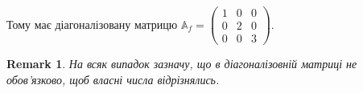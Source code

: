 \documentclass[a4paper, 10pt]{article}
\theoremstyle{theoremdd}
\newtheorem{remark}[theorem]{Remark}
\begin{document}
Тому має діагоналізовану матрицю $\mathbb{A}_f = \begin{pmatrix}
1 & 0 & 0 \\
0 & 2 & 0 \\
0 & 0 & 3
\end{pmatrix}$.
\iffalse
Ба більше, ми можемо розкрити деякі цікаві факти\\
\begin{tikzcd}
\mathbb{R}^3_f \arrow{r}{\mathbb{A}_f} \arrow{d}[swap]{U} & \mathbb{R}^3_f \arrow{d}{U} \\
\mathbb{R}^3_e \arrow{r}{A} & \mathbb{R}^3_e
\end{tikzcd}\\
Тут $U = \begin{pmatrix}
1 & 1 & 1 \\
1 & 0 & 1 \\
1 & 1 & 0 \\
\end{pmatrix}$\\
З картинки можна знайти:\\
$A = U \mathbb{A}_f U^{-1}$\\
$A^2 = A\cdot A = U \mathbb{A}_f U^{-1} U \mathbb{A}_f U^{-1} = U \mathbb{A}_f^2 U^{-1}$\\
$A^3 = A^2 \cdot A = U \mathbb{A}^2_f U^{-1} U \mathbb{A}_f U^{-1} = U \mathbb{A}_f^3 U^{-1}$\\
Ну і т.д.
\fi
\begin{remark}
На всяк випадок зазначу, що в діагоналізовній матриці не обов'язково, щоб власні числа відрізнялись.
\end{remark}
\end{document}
